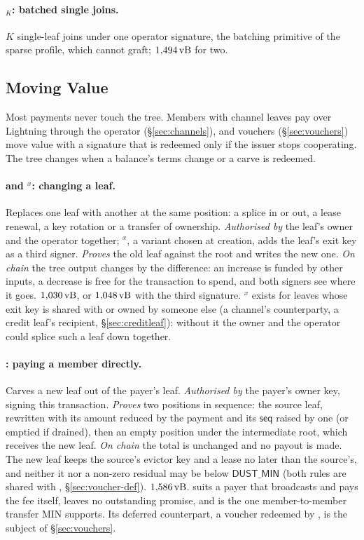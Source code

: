 \paragraph{$_K$: batched single joins.} $K$ single-leaf joins
under one operator signature, the batching primitive of the sparse
profile, which cannot graft; $1{,}494\,\mathrm{vB}$ for two.

\subsection{Moving Value}

Most payments never touch the tree. Members with channel leaves pay over
Lightning through the operator (\S\ref{sec:channels}), and vouchers
(\S\ref{sec:vouchers}) move value with a signature that is redeemed
only if the issuer stops cooperating. The tree changes when a balance's
terms change or a carve is redeemed.

\paragraph{ and $^{x}$: changing a leaf.} Replaces
one leaf with another at the same position: a splice in or out, a lease
renewal, a key rotation or a transfer of ownership. \emph{Authorised by}
the leaf's owner and the operator together; $^{x}$, a variant
chosen at creation, adds the leaf's exit key as a third signer.
\emph{Proves} the old leaf against the root and writes the new one.
\emph{On chain} the tree output changes by the difference: an increase is
funded by other inputs, a decrease is free for the transaction to spend,
and both signers see where it goes. $1{,}030\,\mathrm{vB}$, or $1{,}048\,\mathrm{vB}$ with
the third signature. $^{x}$ exists for leaves whose exit key
is shared with or owned by someone else (a channel's counterparty, a
credit leaf's recipient, \S\ref{sec:creditleaf}): without it the owner
and the operator could splice such a leaf down together.

\paragraph{: paying a member directly.} Carves a new leaf out
of the payer's leaf. \emph{Authorised by} the payer's owner key, signing
this transaction. \emph{Proves} two positions in sequence: the source
leaf, rewritten with its amount reduced by the payment and its
$\mathsf{seq}$ raised by one (or emptied if drained), then an empty
position under the intermediate root, which receives the new leaf.
\emph{On chain} the total is unchanged and no payout is made. The new
leaf keeps the source's evictor key and a lease no later than the
source's, and neither it nor a non-zero residual may be below
$\mathsf{DUST\_MIN}$ (both rules are shared with ,
\S\ref{sec:voucher-def}). $1{,}586\,\mathrm{vB}$.  suits a payer that broadcasts and pays the fee itself, leaves
no outstanding promise, and is the one member-to-member transfer MIN
supports. Its deferred counterpart, a voucher redeemed by
, is the subject of \S\ref{sec:vouchers}.


